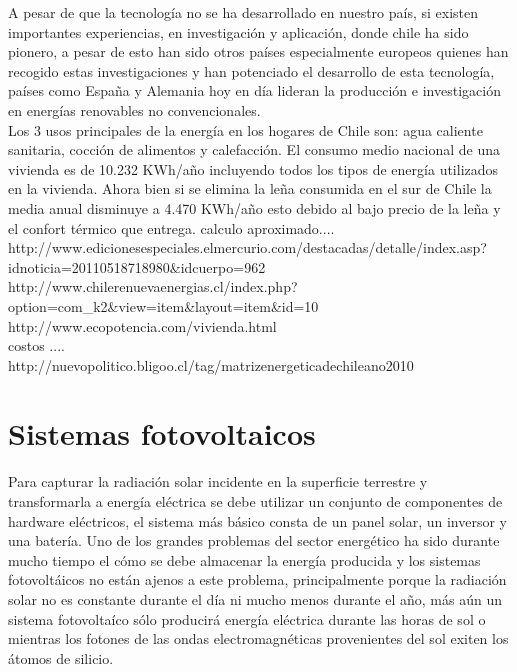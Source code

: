 A pesar de que la tecnología no se ha desarrollado en nuestro país, si existen importantes experiencias, en investigación y aplicación, donde chile ha sido pionero\cite{colegioIng:2}, a pesar de esto han sido otros países especialmente europeos quienes han recogido estas investigaciones y han potenciado el desarrollo de esta tecnología, países como España y Alemania hoy en día lideran la producción e investigación en energías renovables no convencionales.\\

Los 3 usos principales de la energía en los hogares de Chile son: agua caliente sanitaria, cocción de alimentos y calefacción. El consumo medio nacional de una vivienda es de 10.232 KWh/año incluyendo todos los tipos de energía utilizados en la vivienda. Ahora bien si se elimina la leña consumida en el sur de Chile la media anual disminuye a 4.470 KWh/año esto debido al bajo precio de la leña y el confort térmico que entrega.
calculo aproximado....\\

http://www.edicionesespeciales.elmercurio.com/destacadas/detalle/index.asp?idnoticia=20110518718980\&idcuerpo=962\\
http://www.chilerenuevaenergias.cl/index.php?option=com\_k2\&view=item\&layout=item\&id=10\\
http://www.ecopotencia.com/vivienda.html\\

costos ....\\
http://nuevopolitico.bligoo.cl/tag/matrizenergeticadechileano2010\\

\section{Sistemas fotovoltaicos}
Para capturar la radiación solar incidente en la superficie terrestre y transformarla a energía eléctrica se debe utilizar un conjunto de componentes de hardware eléctricos, el sistema más básico consta de un panel solar, un inversor y una batería. Uno de los grandes problemas del sector energético ha sido durante mucho tiempo el cómo se debe almacenar la energía producida y los sistemas fotovoltáicos no están ajenos a este problema, principalmente porque la radiación solar no es constante durante el día ni mucho menos durante el año, más aún un sistema fotovoltaíco sólo producirá energía eléctrica durante las horas de sol o mientras los fotones de las ondas electromagnéticas provenientes del sol exiten los átomos de silicio.


